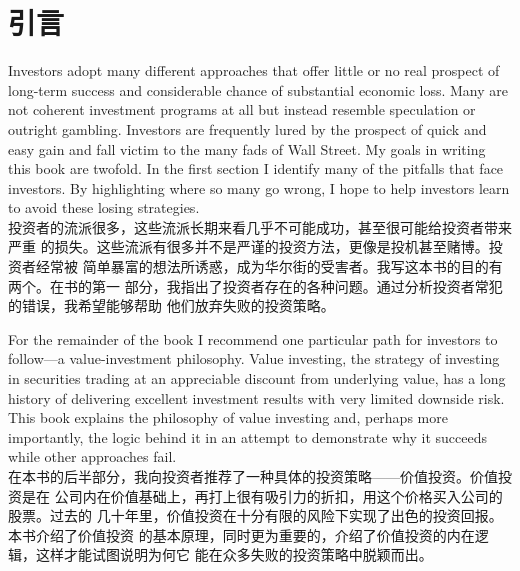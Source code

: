 \chapter{引言}

\begin{verseparallel}
  {
    \noindent Investors adopt many different approaches that offer little or
    no real prospect of long-term success and considerable chance of
    substantial economic loss. Many are not coherent investment programs at
    all but instead resemble speculation or outright gambling. Investors are
    frequently lured by the prospect of quick and easy gain and fall victim to
    the many fads of Wall Street. My goals in writing this book are twofold.
    In the first section I identify many of the pitfalls that face investors.
    By highlighting where so many go wrong, I hope to help investors learn to
    avoid these losing strategies. \\
  }
  {
    投资者的流派很多，这些流派长期来看几乎不可能成功，甚至很可能给投资者带来严重
    的损失。这些流派有很多并不是严谨的投资方法，更像是投机甚至赌博。投资者经常被
    简单暴富的想法所诱惑，成为华尔街的受害者。我写这本书的目的有两个。在书的第一
    部分，我指出了投资者存在的各种问题。通过分析投资者常犯的错误，我希望能够帮助
    他们放弃失败的投资策略。
  }
\end{verseparallel}

\begin{verseparallel}
  {
    For the remainder of the book I recommend one particular path for investors
    to follow—a value-investment philosophy. Value investing, the strategy of
    investing in securities trading at an appreciable discount from underlying
    value, has a long history of delivering excellent investment results with
    very limited downside risk. This book explains the philosophy of value
    investing and, perhaps more importantly, the logic behind it in an attempt
    to demonstrate why it succeeds while other approaches fail. \\
  }
  {
    在本书的后半部分，我向投资者推荐了一种具体的投资策略——价值投资。价值投资是在
    公司内在价值基础上，再打上很有吸引力的折扣，用这个价格买入公司的股票。过去的
    几十年里，价值投资在十分有限的风险下实现了出色的投资回报。本书介绍了价值投资
    的基本原理，同时更为重要的，介绍了价值投资的内在逻辑，这样才能试图说明为何它
    能在众多失败的投资策略中脱颖而出。
  }
\end{verseparallel}

